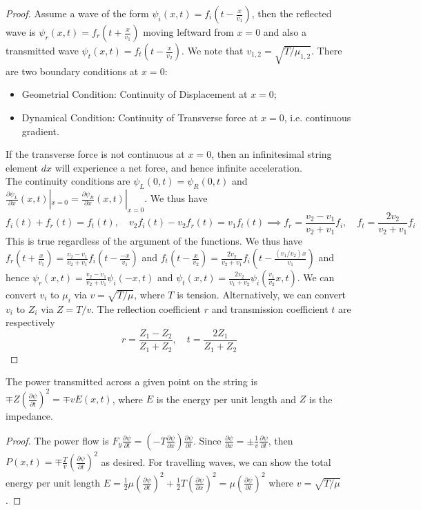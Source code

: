 \documentclass[a4paper]{article}
\begin{document}
\begin{proof}
Assume a wave of the form $\psi_i(x,t)=f_i(t-\frac{x}{v_1})$, then the reflected wave is $\psi_r(x,t)=f_r(t+\frac{x}{v_1})$ moving leftward from $x=0$ and also a transmitted wave $\psi_t(x,t)=f_t(t-\frac{x}{v_2})$. We note that $v_{1,2}=\sqrt{T/\mu_{1,2}}$. There are two boundary conditions at $x=0$:
\begin{itemize}
    \item Geometrial Condition: Continuity of Displacement at $x=0$;
    \item Dynamical Condition: Continuity of Transverse force at $x=0$, i.e. continuous gradient.
\end{itemize}
If the transverse force is not continuous at $x=0$, then an infinitesimal string element $dx$ will experience a net force, and hence infinite acceleration.\\[5pt]
The continuity conditions are $\psi_L(0,t)=\psi_R(0,t)$ and $\frac{\partial\psi_L}{\partial x}(x,t)|_{x=0}=\frac{\partial\psi_R}{\partial x}(x,t)|_{x=0}$. We thus have
$$f_i(t)+f_r(t)=f_t(t),\quad v_2f_i(t)-v_2f_r(t)=v_1f_t(t)\implies f_r=\frac{v_2-v_1}{v_2+v_1}f_i,\quad f_t=\frac{2v_2}{v_2+v_1}f_i$$
This is true regardless of the argument of the functions. We thus have $f_r(t+\frac{x}{v_1})=\frac{v_2-v_1}{v_2+v_1}f_i(t-\frac{-x}{v_1})$ and $f_t(t-\frac{x}{v_2})=\frac{2v_2}{v_2+v_1}f_i(t-\frac{(v_1/v_2)x}{v_1})$ and hence $\psi_r(x,t)=\frac{v_2-v_1}{v_2+v_1}\psi_i(-x,t)$ and $\psi_t(x,t)=\frac{2v_2}{v_1+v_2}\psi_i(\frac{v_1}{v_2}x,t)$. We can convert $v_i$ to $\mu_i$ via $v=\sqrt{T/\mu}$, where $T$ is tension. Alternatively, we can convert $v_i$ to $Z_i$ via $Z=T/v$. The reflection coefficient $r$ and transmission coefficient $t$ are respectively
$$r=\frac{Z_1-Z_2}{Z_1+Z_2},\quad t=\frac{2Z_1}{Z_1+Z_2}$$
\end{proof}
\begin{thm}
The power transmitted across a given point on the string is $\mp Z(\frac{\partial\psi}{\partial t})^2=\mp vE(x,t)$, where $E$ is the energy per unit length and $Z$ is the impedance.
\end{thm}
\begin{proof}
The power flow is $F_y\frac{\partial\psi}{\partial t}=(-T\frac{\partial\psi}{\partial x})\frac{\partial\psi}{\partial t}$. Since $\frac{\partial\psi}{\partial x}=\pm\frac{1}{v}\frac{\partial\psi}{\partial t}$, then $P(x,t)=\mp\frac{T}{v}(\frac{\partial\psi}{\partial t})^2$ as desired. For travelling waves, we can show the total energy per unit length $E=\frac{1}{2}\mu(\frac{\partial\psi}{\partial t})^2+\frac{1}{2}T(\frac{\partial\psi}{\partial x})^2=\mu(\frac{\partial\psi}{\partial t})^2$ where $v=\sqrt{T/\mu}$.
\end{proof}
\end{document}
